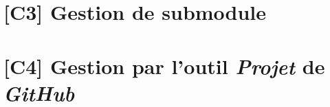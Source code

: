 \documentclass{article}
\begin{document}

\section*{\color{BrickRed}[C3] Gestion de submodule}

\section*{\color{BrickRed}[C4] Gestion par l'outil \textit{Projet} de \textit{GitHub}}

\end{document}
